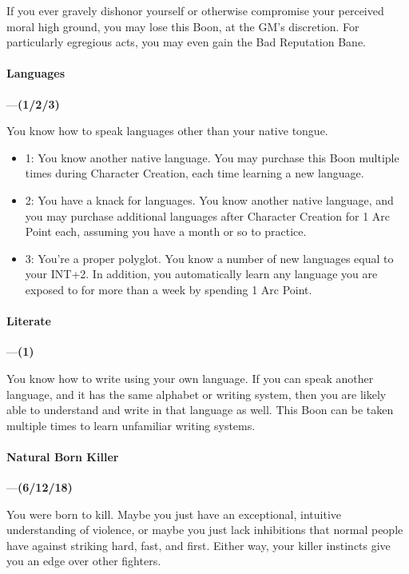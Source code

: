 \documentclass[oneside,11pt,english]{book}
\begin{document}
If you ever gravely dishonor yourself or otherwise compromise your perceived moral high ground, you 
may lose this Boon, at the GM's discretion. For particularly egregious acts, you may even gain the Bad 
Reputation Bane. 



\paragraph{\label{boon:Languages}Languages}---\quad\textbf{(1/2/3) }\par
You know how to speak languages other than your native tongue. 
\begin{itemize}
\item 1: You know another native language. You may purchase this Boon multiple times during Character 
  Creation, each time learning a new language. 
\item 2: You have a knack for languages. You know another native language, and you may purchase additional 
  languages after Character Creation for 1 Arc Point each, assuming you have a month or so to practice. 
\item 3: You're a proper polyglot. You know a number of new languages equal to your INT+2. In addition, you 
  automatically learn any language you are exposed to for more than a week by spending 1 Arc Point. 
\end{itemize}
\paragraph{\label{boon:Literate}Literate}---\quad\textbf{(1) }\par
You know how to write using your own language. If you can speak another language, and it has the same 
alphabet or writing system, then you are likely able to understand and write in that language as well. This 
Boon can be taken multiple times to learn unfamiliar writing systems. 


\paragraph{\label{boon:Natural Born Killer}Natural Born Killer}---\quad\textbf{(6/12/18) }\par
You were born to kill. Maybe you just have an exceptional, intuitive understanding of violence, or maybe 
you just lack inhibitions that normal people have against striking hard, fast, and first. Either way, your 
killer instincts give you an edge over other fighters. 
\end{document}
